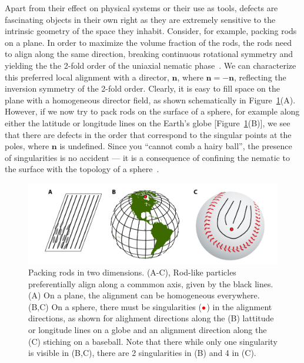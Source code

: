 Apart from their effect on physical systems or their use as tools, defects are fascinating objects in their own right as they are extremely sensitive to the intrinsic geometry of the space they inhabit.
Consider, for example, packing rods on a plane.
In order to maximize the volume fraction of the rods, the rods need to align along the same direction, breaking continuous rotational symmetry and yielding the the 2-fold order of the uniaxial nematic phase~\cite{RN204}.
We can characterize this preferred local alignment with a director, $\mathbf{n}$, where $\mathbf{n} = \mathbf{-n}$, reflecting the inversion symmetry of the 2-fold order.
Clearly, it is easy to fill space on the plane with a homogeneous director field, as shown schematically in Figure~\ref{f:1-RodsPlane}(A).
However, if we now try to pack rods on the surface of a sphere, for example along either the latitude or longitude lines on the Earth's globe [Figure~\ref{f:1-RodsPlane}(B)], we see that there are defects in the order that correspond to the singular points at the poles, where $\mathbf{n}$ is undefined.
Since you ``cannot comb a hairy ball'', the presence of singularities is no accident --- it is a consequence of confining the nematic to the surface with the topology of a sphere~\cite{RN209,RN169}.
\begin{figure}
  \centering
  \includegraphics{figures/C1/Ch1-Figs_RodsPlane.png}
  \caption{Packing rods in two dimensions.
  (A-C), Rod-like particles preferentially align along a commmon axis, given by the black lines.
  (A) On a plane, the alignment can be homogeneous everywhere.
  (B,C) On a sphere, there must be singularities (${\color{red} \bullet}$) in the alignment directions, as shown for alighment directions along the (B) lattitude or longitude lines on a globe and an alignment direction along the (C) stiching on a baseball.
  Note that there while only one singularity is visible in (B,C), there are 2 singularities in (B) and 4 in (C).}\label{f:1-RodsPlane}
\end{figure}


